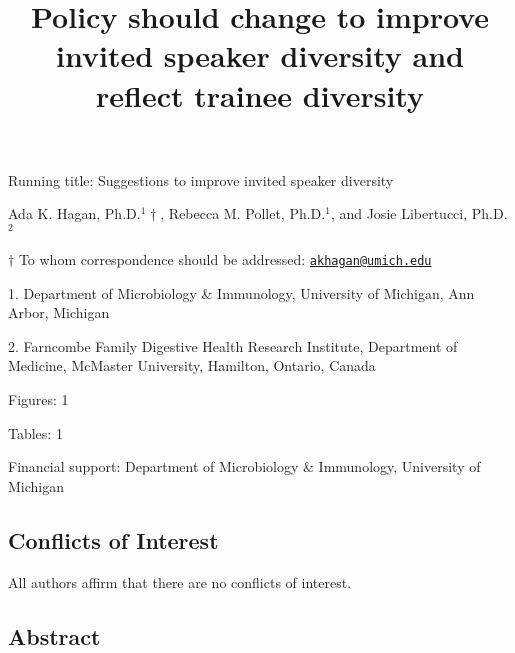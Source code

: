 \documentclass[10pt,]{article}
\title{\textbf{Policy should change to improve invited speaker diversity and
reflect trainee diversity}}
\author{}
\date{}
\begin{document}
\maketitle

\vspace{30mm}

Running title: Suggestions to improve invited speaker diversity

\vspace{35mm}

Ada K. Hagan, Ph.D.\({^1\dagger}\), Rebecca M. Pollet, Ph.D.\({^1}\),
and Josie Libertucci, Ph.D.\({^2}\)

\vspace{35mm}

\(\dagger\) To whom correspondence should be addressed:
\href{mailto:akhagan@umich.edu}{\nolinkurl{akhagan@umich.edu}}

1. Department of Microbiology \& Immunology, University of Michigan, Ann
Arbor, Michigan

2. Farncombe Family Digestive Health Research Institute, Department of
Medicine, McMaster University, Hamilton, Ontario, Canada

Figures: 1

Tables: 1

Financial support: Department of Microbiology \& Immunology, University
of Michigan

\newpage

\subsection{Conflicts of Interest}\label{conflicts-of-interest}

\vspace{40mm}

All authors affirm that there are no conflicts of interest.

\newpage

\linenumbers

\subsection{Abstract}\label{abstract}
\end{document}
